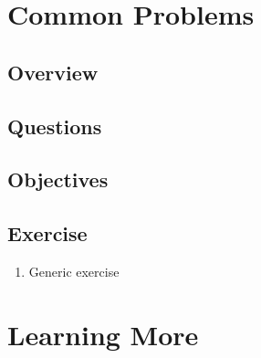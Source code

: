 \documentclass[]{article}
\providecommand{\tightlist}{%
  \setlength{\itemsep}{0pt}\setlength{\parskip}{0pt}}
\begin{document}
\hypertarget{common-problems}{%
\section{Common Problems}\label{common-problems}}

\hypertarget{overview-7}{%
\subsection{Overview}\label{overview-7}}

\hypertarget{questions-7}{%
\subsection{Questions}\label{questions-7}}

\hypertarget{objectives-6}{%
\subsection{Objectives}\label{objectives-6}}

\hypertarget{exercise-5}{%
\subsection{Exercise}\label{exercise-5}}

\begin{enumerate}
\def\labelenumi{\arabic{enumi}.}
\tightlist
\item
  Generic exercise
\end{enumerate}

\hypertarget{learning-more}{%
\section{Learning More}\label{learning-more}}
\end{document}
